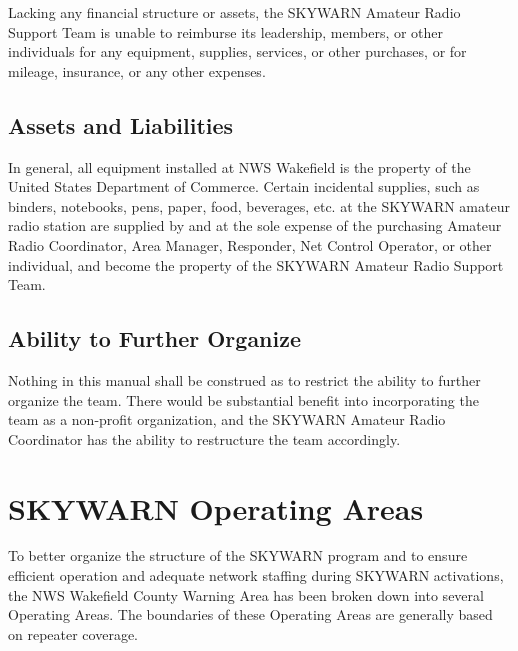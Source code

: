 \documentclass[pdflatex,letterpaper,twoside,12pt]{book}
\begin{document}
Lacking any financial structure or assets, the SKYWARN Amateur Radio Support Team is unable to reimburse its leadership, members, or other individuals for any equipment, supplies, services, or other purchases, or for mileage, insurance, or any other expenses.


\section{Assets and Liabilities}

In general, all equipment installed at NWS Wakefield is the property of the United States Department of Commerce.  Certain incidental supplies, such as binders, notebooks, pens, paper, food, beverages, etc. at the SKYWARN amateur radio station are supplied by and at the sole expense of the purchasing Amateur Radio Coordinator, Area Manager, Responder, Net Control Operator, or other individual, and become the property of the SKYWARN Amateur Radio Support Team. 


\section{Ability to Further Organize}

Nothing in this manual shall be construed as to restrict the ability to further organize the team.  There would be substantial benefit into incorporating the team as a non-profit organization, and the SKYWARN Amateur Radio Coordinator has the ability to restructure the team accordingly.


\chapter{SKYWARN Operating Areas}

To better organize the structure of the SKYWARN program and to ensure efficient operation and adequate network staffing during SKYWARN activations, the NWS Wakefield County Warning Area has been broken down into several Operating Areas.  The boundaries of these Operating Areas are generally based on repeater coverage.
\end{document}
